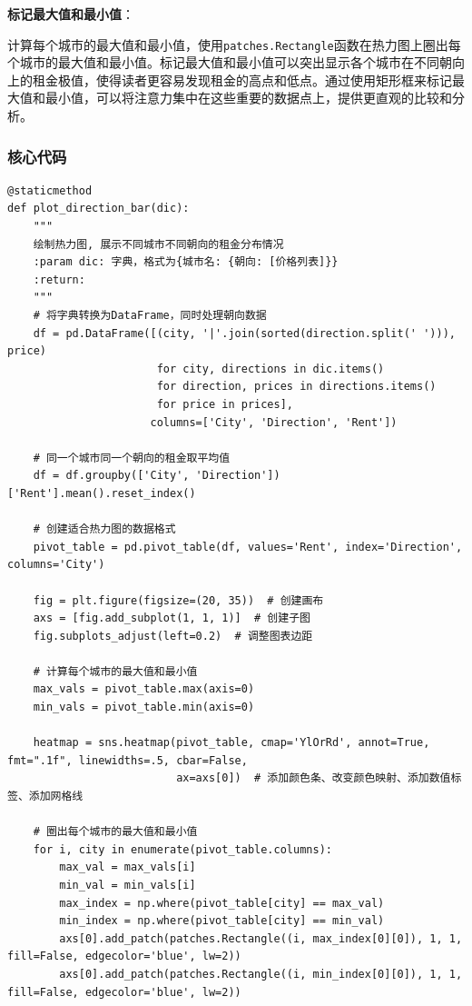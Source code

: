 \documentclass[lang=cn,11pt,a4paper]{elegantpaper}
\begin{document}
\textbf{标记最大值和最小值}：

计算每个城市的最大值和最小值，使用\lstinline{patches.Rectangle}函数在热力图上圈出每个城市的最大值和最小值。标记最大值和最小值可以突出显示各个城市在不同朝向上的租金极值，使得读者更容易发现租金的高点和低点。通过使用矩形框来标记最大值和最小值，可以将注意力集中在这些重要的数据点上，提供更直观的比较和分析。


\subsubsection{核心代码}

\begin{lstlisting}
@staticmethod
def plot_direction_bar(dic):
    """
    绘制热力图, 展示不同城市不同朝向的租金分布情况
    :param dic: 字典，格式为{城市名: {朝向: [价格列表]}}
    :return:
    """
    # 将字典转换为DataFrame，同时处理朝向数据
    df = pd.DataFrame([(city, '|'.join(sorted(direction.split(' '))), price)
                       for city, directions in dic.items()
                       for direction, prices in directions.items()
                       for price in prices],
                      columns=['City', 'Direction', 'Rent'])

    # 同一个城市同一个朝向的租金取平均值
    df = df.groupby(['City', 'Direction'])['Rent'].mean().reset_index()

    # 创建适合热力图的数据格式
    pivot_table = pd.pivot_table(df, values='Rent', index='Direction', columns='City')

    fig = plt.figure(figsize=(20, 35))  # 创建画布
    axs = [fig.add_subplot(1, 1, 1)]  # 创建子图
    fig.subplots_adjust(left=0.2)  # 调整图表边距

    # 计算每个城市的最大值和最小值
    max_vals = pivot_table.max(axis=0)
    min_vals = pivot_table.min(axis=0)

    heatmap = sns.heatmap(pivot_table, cmap='YlOrRd', annot=True, fmt=".1f", linewidths=.5, cbar=False,
                          ax=axs[0])  # 添加颜色条、改变颜色映射、添加数值标签、添加网格线

    # 圈出每个城市的最大值和最小值
    for i, city in enumerate(pivot_table.columns):
        max_val = max_vals[i]
        min_val = min_vals[i]
        max_index = np.where(pivot_table[city] == max_val)
        min_index = np.where(pivot_table[city] == min_val)
        axs[0].add_patch(patches.Rectangle((i, max_index[0][0]), 1, 1, fill=False, edgecolor='blue', lw=2))
        axs[0].add_patch(patches.Rectangle((i, min_index[0][0]), 1, 1, fill=False, edgecolor='blue', lw=2))


\end{lstlisting}
\end{document}
